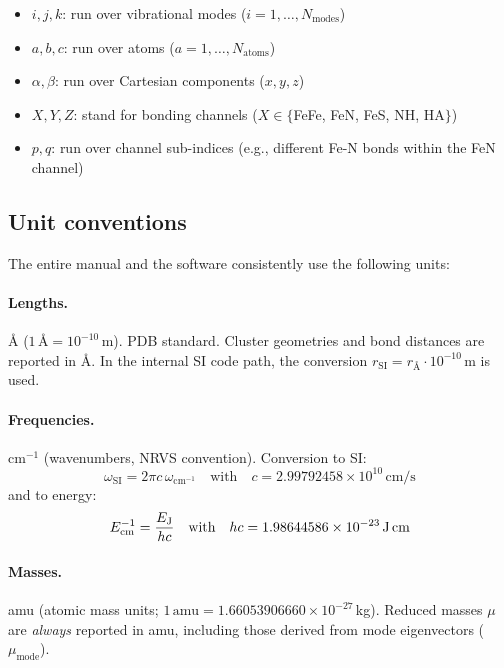 \documentclass[11pt,a4paper,twoside]{article}
\providecommand{\angstrom}{\text{\AA}}    %
\theoremstyle{remark}
\begin{document}
\begin{itemize}\setlength{\itemsep}{2pt}
  \item $i, j, k$: run over vibrational modes
        ($i = 1, \ldots, N_\text{modes}$)
  \item $a, b, c$: run over atoms
        ($a = 1, \ldots, N_\text{atoms}$)
  \item $\alpha, \beta$: run over Cartesian components
        ($x, y, z$)
  \item $X, Y, Z$: stand for bonding channels
        ($X \in \{$FeFe, FeN, FeS, NH, HA$\}$)
  \item $p, q$: run over channel sub-indices (e.g., different
        Fe-N bonds within the FeN channel)
\end{itemize}

\subsection{Unit conventions}

The entire manual and the software consistently use the
following units:

\paragraph{Lengths.}
$\angstrom$ ($1\,\angstrom = 10^{-10}$\,m). PDB standard. Cluster
geometries and bond distances are reported in $\angstrom$. In the
internal SI code path, the conversion
$r_\text{SI} = r_{\angstrom} \cdot 10^{-10}$\,m is used.

\paragraph{Frequencies.}
cm$^{-1}$ (wavenumbers, NRVS convention). Conversion to SI:
\begin{equation}
  \omega_\text{SI} = 2\pi c\,\omega_{\text{cm}^{-1}}
  \quad\text{with}\quad c = 2.99792458 \times 10^{10}\,\text{cm/s}
\end{equation}
and to energy:
\begin{equation}
  E_\text{cm}^{-1} = \frac{E_\text{J}}{h c}
  \quad\text{with}\quad h c = 1.98644586 \times 10^{-23}\,\text{J\,cm}
\end{equation}

\paragraph{Masses.}
amu (atomic mass units; $1\,\text{amu} = 1.66053906660 \times
10^{-27}$\,kg). Reduced masses $\mu$ are \emph{always} reported in
amu, including those derived from mode eigenvectors
($\mu_\text{mode}$).
\end{document}
